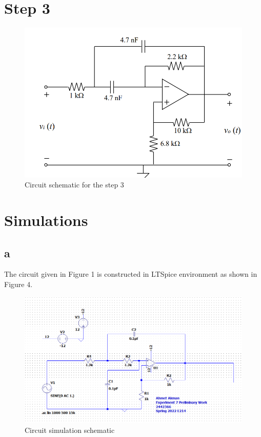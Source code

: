 \documentclass[letterpaper,12pt]{article}
\begin{document}
\section{Step 3}
\begin{figure}[H]
    \centering
    \includegraphics[width=1\textwidth]{fig3.png}
    \caption{Circuit schematic for the step 3}
\end{figure} 
\section{Simulations}
\subsection*{a}
The circuit given in Figure 1 is constructed in LTSpice environment as shown in Figure 4.
\begin{figure}[H]
    \centering
    \includegraphics[width=1\textwidth]{fig1sim.png}
    \caption{Circuit simulation schematic}
\end{figure} 
\end{document}
